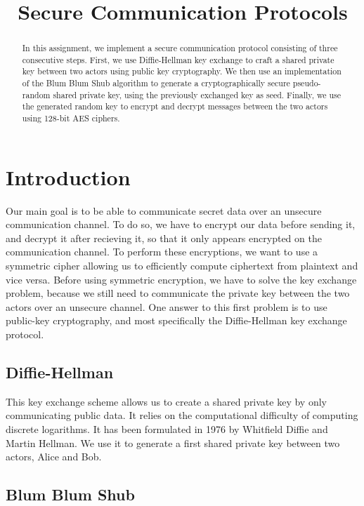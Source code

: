 \documentclass{article}
\title{\textbf{Secure Communication Protocols}}
\author{}
\date{}
\begin{document}
\maketitle \thispagestyle{fancy}

\begin{abstract}
    In this assignment, we implement a secure communication protocol consisting of three consecutive steps. First, we use Diffie-Hellman\cite{stallings_2017} key exchange to craft a shared private key between two actors using public key cryptography. We then use an implementation of the Blum Blum Shub algorithm to generate a cryptographically secure pseudo-random shared private key, using the previously exchanged key as seed. Finally, we use the generated random key to encrypt and decrypt messages between the two actors using 128-bit AES ciphers.
\end{abstract}

\section{Introduction}

Our main goal is to be able to communicate secret data over an unsecure communication channel. To do so, we have to encrypt our data before sending it, and decrypt it after recieving it, so that it only appears encrypted on the communication channel.
To perform these encryptions, we want to use a symmetric cipher allowing us to efficiently compute ciphertext from plaintext and vice versa. Before using symmetric encryption, we have to solve the key exchange problem, because we still need to communicate the private key between the two actors over an unsecure channel.
One answer to this first problem is to use public-key cryptography, and most specifically the Diffie-Hellman key exchange protocol. 

\subsection{Diffie-Hellman}

This key exchange scheme allows us to create a shared private key by only communicating public data. It relies on the computational difficulty of computing discrete logarithms. It has been formulated in 1976 by Whitfield Diffie and Martin Hellman. We use it to generate a first shared private key between two actors, Alice and Bob.

\subsection{Blum Blum Shub}
\end{document}
